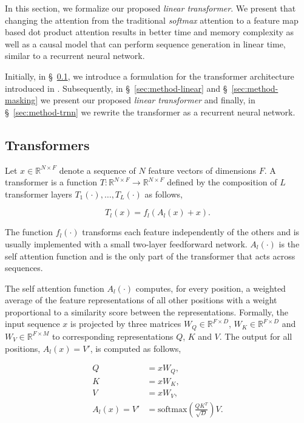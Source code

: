 In this section, we formalize our proposed \emph{linear transformer}. We present that changing the attention from the traditional \emph{softmax} attention to a feature map based dot product attention results in better time and memory complexity as well as a causal model that can perform sequence generation in linear time, similar to a recurrent neural network.

Initially, in \S~\ref{sec:method-intro}, we introduce a formulation for the transformer architecture introduced in \cite{vaswani_attn}. Subsequently, in
\S~\ref{sec:method-linear} and \S~\ref{sec:method-masking} we present our proposed \emph{linear transformer} and finally, in \S~\ref{sec:method-trnn} we rewrite the transformer as a recurrent neural network.

\subsection{Transformers} \label{sec:method-intro}

Let $x \in \mathbb{R}^{N \times F}$ denote a sequence of $N$ feature vectors of dimensions $F$. A transformer is a function $T : \mathbb{R}^{N \times F} \to \mathbb{R}^{N \times F}$ defined by the composition of $L$ transformer layers $T_1(\cdot), \dots,
T_L(\cdot)$ as follows,

\begin{equation}
    T_l(x) = f_l(A_l(x) + x).
    \label{eq:transformer}
\end{equation}

The function $f_l(\cdot)$ transforms each feature independently of the others and is usually implemented with a small two-layer feedforward network. $A_l(\cdot)$ is the self attention function and is the only part of the transformer that acts across sequences.

The self attention function $A_l(\cdot)$ computes, for every position, a weighted average of the feature representations of all other positions with a weight proportional to a similarity score between the representations. Formally, the input sequence $x$ is projected by three matrices $W_Q \in \mathbb{R}^{F
\times D}$, $W_K \in \mathbb{R}^{F \times D}$ and $W_V \in \mathbb{R}^{F \times M}$ to corresponding representations $Q$, $K$ and $V$. The output for all positions, $A_l(x) = V'$, is computed as follows,

\begin{equation}
\begin{aligned}
    Q &= x W_Q, \\
    K &= x W_K,  \\
    V &= x W_V, \\
    A_l(x) = V' &= \text{softmax}\left(\frac{Q K^T}{\sqrt{D}}\right) V.
    \label{eq:attn}
\end{aligned}
\end{equation}

